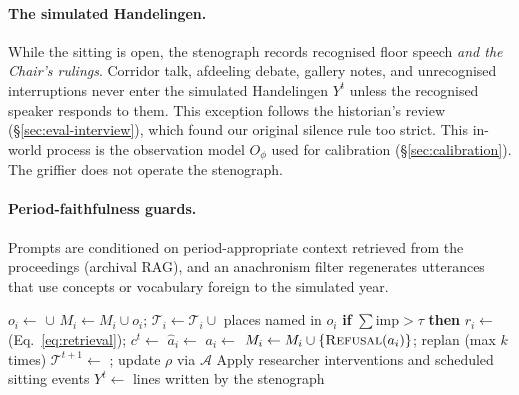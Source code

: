 \documentclass[sigconf,review,anonymous]{acmart}
\newcommand{\sys}{\textsc{Kamer}}
\begin{document}
\paragraph{The simulated Handelingen.} While the sitting is open, the
stenograph records recognised floor speech \emph{and the Chair's rulings}.
Corridor talk, afdeeling debate, gallery notes, and unrecognised
interruptions never enter the simulated Handelingen $Y^t$ unless the
recognised speaker responds to them. This exception follows the
historian's review (\S\ref{sec:eval-interview}), which found our original
silence rule too strict. This in-world process is the observation model
$O_\phi$ used for calibration (\S\ref{sec:calibration}). The griffier does
not operate the stenograph.

\paragraph{Period-faithfulness guards.} Prompts are conditioned on
period-appropriate context retrieved from the proceedings (archival RAG),
and an anachronism filter regenerates utterances that use concepts or
vocabulary foreign to the simulated year.

\begin{algorithm}[t]
\caption{One sandbox step of \sys{}}
\label{alg:step}
\small
\begin{algorithmic}[1]
  \State $o_i \gets$  $\cup$ 
  \State $M_i \gets M_i \cup o_i$;\; $\mathcal{T}_i\gets\mathcal{T}_i\cup$ places named in $o_i$
  \State \textbf{if} $\sum\text{imp}>\tau$ \textbf{then} 
  \State $r_i \gets$  (Eq.~\ref{eq:retrieval});\; $c^t \gets$ 
  \State $\hat a_i \gets$ 
  \State $a_i \gets$  
     \State $M_i \gets M_i\cup\{\textsc{Refusal}(a_i)\}$;\; replan (max $k$ times)
  \EndIf
\EndFor
\State $\mathcal{T}^{t+1}\gets$ ; update $\rho$ via $\mathcal{A}$
\State Apply researcher interventions and scheduled sitting events
\State $Y^{t}\gets$ lines written by the stenograph 
\end{algorithmic}
\end{algorithm}

\end{document}
